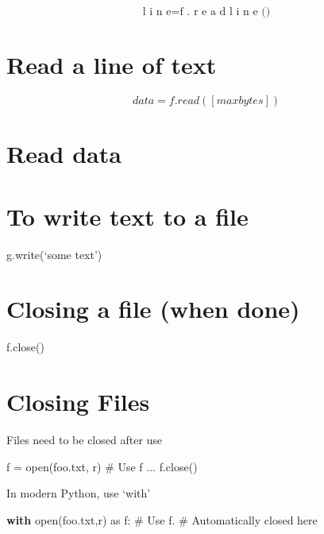 \documentclass[
  letterpaper,
  DIV=11,
  numbers=noendperiod]{scrreprt}
\newenvironment{Shaded}{\begin{snugshade}}{\end{snugshade}}
\newcommand{\BuiltInTok}[1]{\textcolor[rgb]{0.00,0.23,0.31}{#1}}
\newcommand{\CommentTok}[1]{\textcolor[rgb]{0.37,0.37,0.37}{#1}}
\newcommand{\ControlFlowTok}[1]{\textcolor[rgb]{0.00,0.23,0.31}{\textbf{#1}}}
\newcommand{\ImportTok}[1]{\textcolor[rgb]{0.00,0.46,0.62}{#1}}
\newcommand{\NormalTok}[1]{\textcolor[rgb]{0.00,0.23,0.31}{#1}}
\newcommand{\StringTok}[1]{\textcolor[rgb]{0.13,0.47,0.30}{#1}}
\begin{document}
\[
\text {l i n e} = \text {f . r e a d l i n e ()}
\]


\chapter{Read a line of text}\label{read-a-line-of-text}

\[
d a t a = f. r e a d ([ m a x b y t e s ])
\]


\chapter{Read data}\label{read-data}


\chapter{To write text to a file}\label{to-write-text-to-a-file}

g.write(`some text')


\chapter{Closing a file (when done)}\label{closing-a-file-when-done}

f.close()


\chapter{Closing Files}\label{closing-files}

Files need to be closed after use

\begin{Shaded}
\begin{Highlighting}[]
\NormalTok{f = open(\textquotesingle{}foo.txt\textquotesingle{}, \textquotesingle{}r\textquotesingle{})}
\NormalTok{\# Use f}
\NormalTok{...}
\NormalTok{f.close() }
\end{Highlighting}
\end{Shaded}

In modern Python, use `with'

\begin{Shaded}
\begin{Highlighting}[]
\ControlFlowTok{with} \BuiltInTok{open}\NormalTok{(}\StringTok{\textquotesingle{}foo.txt\textquotesingle{}}\NormalTok{,}\StringTok{\textquotesingle{}r\textquotesingle{}}\NormalTok{) }\ImportTok{as}\NormalTok{ f: }\CommentTok{\# Use f. \# Automatically closed here }
\end{Highlighting}
\end{Shaded}
\end{document}
